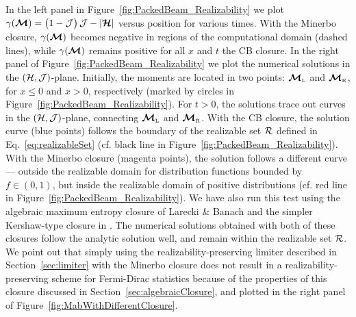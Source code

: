 In the left panel in Figure~\ref{fig:PackedBeam_Realizability} we plot $\gamma(\boldsymbol{\mathcal{M}})=\big(1-\mathcal{J}\big)\,\mathcal{J}-|\boldsymbol{\mathcal{H}}|$ versus position for various times.  
With the Minerbo closure, $\gamma(\boldsymbol{\mathcal{M}})$ becomes negative in regions of the computational domain (dashed lines), while $\gamma(\boldsymbol{\mathcal{M}})$ remains positive for all $x$ and $t$ the CB closure.  
In the right panel of Figure~\ref{fig:PackedBeam_Realizability} we plot the numerical solutions in the $(\mathcal{H},\mathcal{J})$-plane.  
Initially, the moments are located in two points: $\boldsymbol{\mathcal{M}}_{\mbox{\tiny L}}$ and $\boldsymbol{\mathcal{M}}_{\mbox{\tiny R}}$, for $x\le0$ and $x>0$, respectively (marked by circles in Figure~\ref{fig:PackedBeam_Realizability}).  
For $t>0$, the solutions trace out curves in the $(\mathcal{H},\mathcal{J})$-plane, connecting $\boldsymbol{\mathcal{M}}_{\mbox{\tiny L}}$ and $\boldsymbol{\mathcal{M}}_{\mbox{\tiny R}}$.  
With the CB closure, the solution curve (blue points) follows the boundary of the realizable set $\mathcal{R}$ defined in Eq.~\eqref{eq:realizableSet} (cf. black line in Figure~\ref{fig:PackedBeam_Realizability}).  
With the Minerbo closure (magenta points), the solution follows a different curve --- outside the realizable domain for distribution functions bounded by $f\in(0,1)$, but inside the realizable domain of positive distributions (cf. red line in Figure~\ref{fig:PackedBeam_Realizability}).  
We have also run this test using the algebraic maximum entropy closure of Larecki \& Banach \cite{lareckiBanach_2011} and the simpler Kershaw-type closure in \cite{banachLarecki_2017a}.  
The numerical solutions obtained with both of these closures follow the analytic solution well, and remain within the realizable set $\mathcal{R}$.  
We point out that simply using the realizability-preserving limiter described in Section~\ref{sec:limiter} with the Minerbo closure does not result in a realizability-preserving scheme for Fermi-Dirac statistics because of the properties of this closure discussed in Section~\ref{sec:algebraicClosure}, and plotted in the right panel of Figure~\ref{fig:MabWithDifferentClosure}.  

